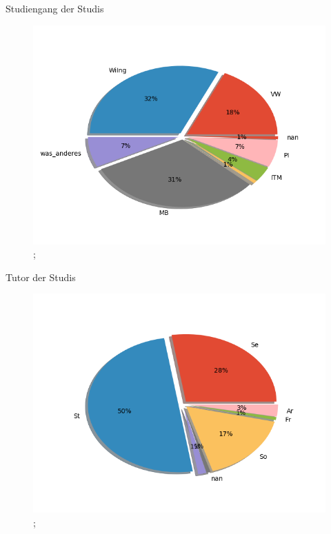 \documentclass[10pt]{beamer}
\begin{document}
\begin{frame}[fragile]{Studiengang der Studis} 
 \begin{figure}
 \includegraphics[width= 0.9\linewidth]{./PDFcreater/Plots/Studiengang+der+Studis.png};
 \end{figure}
 \end{frame}
\begin{frame}[fragile]{Tutor der Studis} 
 \begin{figure}
 \includegraphics[width= 0.9\linewidth]{./PDFcreater/Plots/Tutor+der+Studis.png};
 \end{figure}
 \end{frame}
\end{document}
